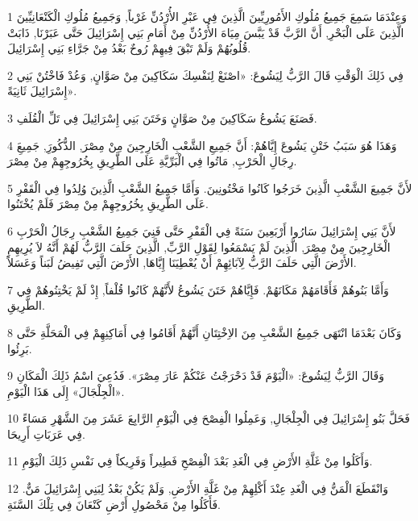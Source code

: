 \par 1 وَعِنْدَمَا سَمِعَ جَمِيعُ مُلُوكِ الأَمُورِيِّينَ الَّذِينَ فِي عَبْرِ الأُرْدُنِّ غَرْباً, وَجَمِيعُ مُلُوكِ الْكَنْعَانِيِّينَ الَّذِينَ عَلَى الْبَحْرِ, أَنَّ الرَّبَّ قَدْ يَبَّسَ مِيَاهَ الأُرْدُنِّ مِنْ أَمَامِ بَنِي إِسْرَائِيلَ حَتَّى عَبَرْنَا, ذَابَتْ قُلُوبُهُمْ وَلَمْ تَبْقَ فِيهِمْ رُوحٌ بَعْدُ مِنْ جَرَّاءِ بَنِي إِسْرَائِيلَ.
\par 2 فِي ذَلِكَ الْوَقْتِ قَالَ الرَّبُّ لِيَشُوعَ: «اصْنَعْ لِنَفْسِكَ سَكَاكِينَ مِنْ صَوَّانٍ, وَعُدْ فَاخْتُنْ بَنِي إِسْرَائِيلَ ثَانِيَةً».
\par 3 فَصَنَعَ يَشُوعُ سَكَاكِينَ مِنْ صَوَّانٍ وَخَتَنَ بَنِي إِسْرَائِيلَ فِي تَلِّ الْقُلَفِ.
\par 4 وَهَذَا هُوَ سَبَبُ خَتْنِ يَشُوعَ إِيَّاهُمْ: أَنَّ جَمِيعِ الشَّعْبِ الْخَارِجِينَ مِنْ مِصْرَ, الذُّكُورَِ, جَمِيعَِ رِجَالِ الْحَرْبِ, مَاتُوا فِي الْبَرِّيَّةِ عَلَى الطَّرِيقِ بِخُرُوجِهِمْ مِنْ مِصْرَ.
\par 5 لأَنَّ جَمِيعَ الشَّعْبِ الَّذِينَ خَرَجُوا كَانُوا مَخْتُونِينَ. وَأَمَّا جَمِيعُ الشَّعْبِ الَّذِينَ وُلِدُوا فِي الْقَفْرِ عَلَى الطَّرِيقِ بِخُرُوجِهِمْ مِنْ مِصْرَ فَلَمْ يُخْتَنُوا.
\par 6 لأَنَّ بَنِي إِسْرَائِيلَ سَارُوا أَرْبَعِينَ سَنَةً فِي الْقَفْرِ حَتَّى فَنِيَ جَمِيعُ الشَّعْبِ رِجَالُ الْحَرْبِ الْخَارِجِينَ مِنْ مِصْرَ, الَّذِينَ لَمْ يَسْمَعُوا لِقَوْلِ الرَّبِّ, الَّذِينَ حَلَفَ الرَّبُّ لَهُمْ أَنَّهُ لاَ يُرِيهِمِ الأَرْضَ الَّتِي حَلَفَ الرَّبُّ لِآبَائِهِمْ أَنْ يُعْطِيَنَا إِيَّاهَا, الأَرْضَ الَّتِي تَفِيضُ لَبَناً وَعَسَلاً.
\par 7 وَأَمَّا بَنُوهُمْ فَأَقَامَهُمْ مَكَانَهُمْ. فَإِيَّاهُمْ خَتَنَ يَشُوعُ لأَنَّهُمْ كَانُوا قُلْفاً, إِذْ لَمْ يَخْتِنُوهُمْ فِي الطَّرِيقِ.
\par 8 وَكَانَ بَعْدَمَا انْتَهَى جَمِيعُ الشَّعْبِ مِنَ الاِخْتِتَانِ أَنَّهُمْ أَقَامُوا فِي أَمَاكِنِهِمْ فِي الْمَحَلَّةِ حَتَّى بَرِئُوا.
\par 9 وَقَالَ الرَّبُّ لِيَشُوعَ: «الْيَوْمَ قَدْ دَحْرَجْتُ عَنْكُمْ عَارَ مِصْرَ». فَدُعِيَ اسْمُ ذَلِكَ الْمَكَانِ «الْجِلْجَالَ» إِلَى هَذَا الْيَوْمِ.
\par 10 فَحَلَّ بَنُو إِسْرَائِيلَ فِي الْجِلْجَالِ, وَعَمِلُوا الْفِصْحَ فِي الْيَوْمِ الرَّابِعَ عَشَرَ مِنَ الشَّهْرِ مَسَاءً فِي عَرَبَاتِ أَرِيحَا.
\par 11 وَأَكَلُوا مِنْ غَلَّةِ الأَرْضِ فِي الْغَدِ بَعْدَ الْفِصْحِ فَطِيراً وَفَرِيكاً فِي نَفْسِ ذَلِكَ الْيَوْمِ.
\par 12 وَانْقَطَعَ الْمَنُّ فِي الْغَدِ عِنْدَ أَكْلِهِمْ مِنْ غَلَّةِ الأَرْضِ, وَلَمْ يَكُنْ بَعْدُ لِبَنِي إِسْرَائِيلَ مَنٌّ. فَأَكَلُوا مِنْ مَحْصُولِ أَرْضِ كَنْعَانَ فِي تِلْكَ السَّنَةِ.

